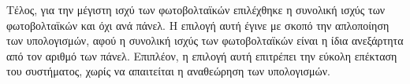 Τέλος, για την μέγιστη ισχύ των φωτοβολταϊκών επιλέχθηκε η συνολική ισχύς των
φωτοβολταϊκών και όχι ανά πάνελ. Η επιλογή αυτή έγινε με σκοπό την απλοποίηση
των υπολογισμών, αφού η συνολική ισχύς των φωτοβολταϊκών είναι η ίδια
ανεξάρτητα από τον αριθμό των πάνελ. Επιπλέον, η επιλογή αυτή επιτρέπει την
εύκολη επέκταση του συστήματος, χωρίς να απαιτείται η αναθεώρηση των
υπολογισμών.

